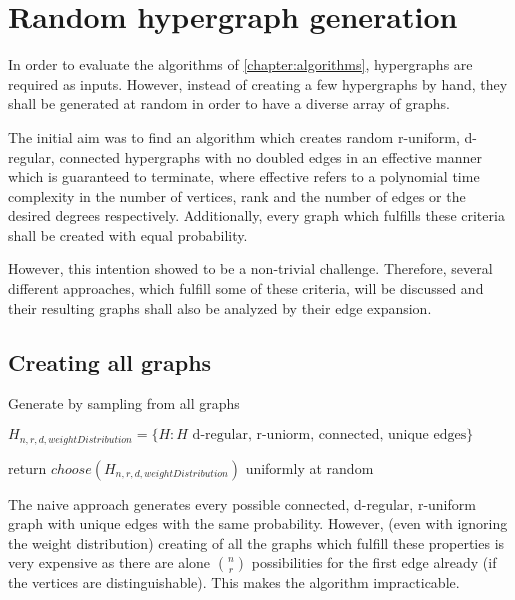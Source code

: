 \chapter{Random hypergraph generation }\label{chapter:random_hypergraphs}
In order to evaluate the algorithms of \cref{chapter:algorithms}, hypergraphs are required as inputs. However, instead of creating a few hypergraphs by hand, they shall be generated at random in order to have a diverse array of graphs.

The initial aim was to find an algorithm which creates random r-uniform, d-regular, connected hypergraphs with no doubled edges in an effective manner which is guaranteed to terminate, where effective refers to a polynomial time complexity in the number of vertices, rank and the number of edges or the desired degrees respectively. Additionally, every graph which fulfills these criteria shall be created with equal probability.

However, this intention showed to be a non-trivial challenge. Therefore, several different approaches, which fulfill some of these criteria, will be discussed and their resulting graphs shall also be analyzed by their edge expansion.
\section{Creating all graphs}

\begin{algorithm}[htpb]
	\caption{Generate by sampling from all graphs\label{alg:sample_all_graphs}} 
	\begin{algorithmic}
		\State $H_{n,r,d,  weightDistribution} = \{H: H\text{ d-regular, r-uniorm, connected, unique edges}\}$
	
		\State return $ choose(H_{n,r,d,  weightDistribution})$ \Comment uniformly at random
		\EndFunction 
	\end{algorithmic}
\end{algorithm}	
The naive approach generates every possible connected, d-regular, r-uniform graph with unique edges with the same probability. However, (even with ignoring the weight distribution) creating of all the graphs which fulfill these properties is very expensive as there are alone $n \choose r$ possibilities for the first edge already (if the vertices are distinguishable). This makes the algorithm impracticable. 

